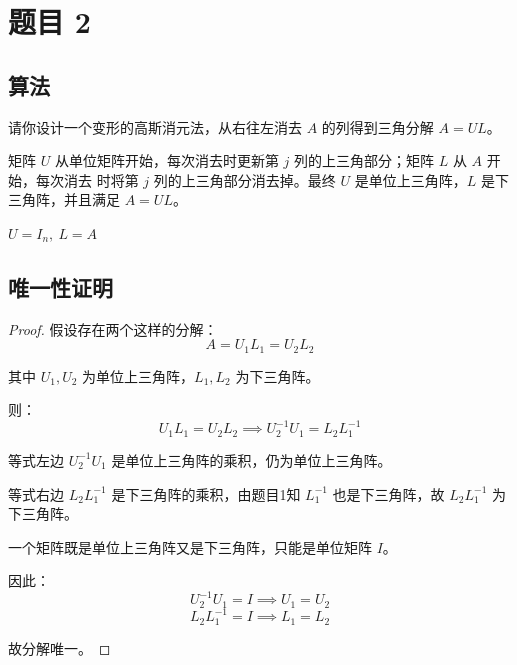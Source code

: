 \documentclass{article}
\begin{document}
\section{题目 2}

\subsection*{算法}

请你设计一个变形的高斯消元法，从右往左消去 $A$ 的列得到三角分解 $A=UL$。
\begin{solution}

  矩阵 $U$ 从单位矩阵开始，每次消去时更新第 $j$ 列的上三角部分；矩阵 $L$ 从 $A$ 开始，每次消去
  时将第 $j$ 列的上三角部分消去掉。最终 $U$ 是单位上三角阵，$L$ 是下三角阵，并且满足 $A = UL$。

  \begin{algorithm}[H]
    \DontPrintSemicolon
    \caption{从右向左的列消去，得到 $A=UL$}
    $U = I_n,\ L = A$\;
    \;
  \end{algorithm}

\end{solution}

\subsection*{唯一性证明}

\begin{proof}
  假设存在两个这样的分解：
  \[
    A = U_1 L_1 = U_2 L_2
  \]

  其中 $U_1, U_2$ 为单位上三角阵，$L_1, L_2$ 为下三角阵。

  则：
  \[
    U_1 L_1 = U_2 L_2 \implies U_2^{-1} U_1 = L_2 L_1^{-1}
  \]

  等式左边 $U_2^{-1} U_1$ 是单位上三角阵的乘积，仍为单位上三角阵。

  等式右边 $L_2 L_1^{-1}$ 是下三角阵的乘积，由题目1知 $L_1^{-1}$ 也是下三角阵，故 $L_2 L_1^{-1}$ 为下三角阵。

  一个矩阵既是单位上三角阵又是下三角阵，只能是单位矩阵 $I$。

  因此：
  \[
    U_2^{-1} U_1 = I \implies U_1 = U_2
  \]
  \[
    L_2 L_1^{-1} = I \implies L_1 = L_2
  \]

  故分解唯一。
\end{proof}
\end{document}
